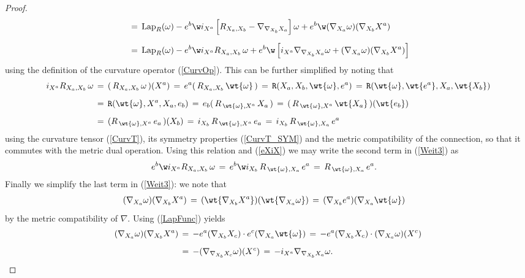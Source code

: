 \documentclass[sections]{tjwNOTES}
\newcommand{\LapR}{\text{Lap}_{R}}
\begin{document}
\begin{proof}
\begin{align}
		\nonumber  &\,=\, \LapR(\omega) - e^{b} \w i_{X^{a}}\left[R_{X_{a},X_{b}} - \nabla_{\nabla_{X_{b}}X_{a}} \right]\omega + e^{b} \w  (\nabla_{X_{a}}\omega)(\nabla_{X_{b}}X^{a}) \\[0.2cm]
		\label{Weit3} &\,=\,  \LapR(\omega) - e^{b} \w i_{X^{a}}R_{X_{a},X_{b}}\,\omega + e^{b} \w \left[i_{X^{a}}\nabla_{\nabla_{X_{b}}X_{a}}\omega + (\nabla_{X_{a}}\omega)(\nabla_{X_{b}}X^{a})\right]
	\end{align}
	using the definition of the curvature operator (\ref{CurvOp}). This can be further simplified by noting that
	\begin{align*}
		i_{X^{a}}R_{X_{a},X_{b}}\,\omega &\,=\, (\,R_{X_{a},X_{b}}\,\omega \,)(X^{a}) \,=\, e^{a}(\,R_{X_{a},X_{b}}\,\wt{\omega} \,) \,=\, \texttt{R}(X_{a},X_{b},\wt{\omega},e^{a}) \,=\, \texttt{R}(\wt{\omega},\wt{e^{a}},X_{a},\wt{X_{b}}) \\[0.2cm]
		&\,=\, \texttt{R}(\wt{\omega},X^{a},X_{a},e_{b}) \,=\, e_{b}( \,R_{\,\wt{\omega},X^{a}}\,X_{a} \,) \,=\, (\, R_{\,\wt{\omega},X^{a}}\,\wt{X_{a}}\, )(\wt{e_{b}}) \\[0.2cm]
		&\,=\, ( R_{\,\wt{\omega},X^{a}}\,e_{a}\, )(X_{b})  \,=\, i_{X_{b}}\,R_{\,\wt{\omega},X^{a}}\,e_{a} \,=\, i_{X_{b}}\,R_{\,\wt{\omega},X_{a}}\,e^{a}
	\end{align*}
	using the curvature tensor (\ref{CurvT}), its symmetry properties (\ref{CurvT_SYM}) and the metric compatibility of the connection, so that it commutes with the metric dual operation. Using this relation and (\ref{eXiX}) we may write the second term in (\ref{Weit3}) as
	\begin{align*}
		e^{b} \w i_{X^{a}}R_{X_{a},X_{b}}\,\omega &\,=\, e^{b} \w i_{X_{b}}\,R_{\,\wt{\omega},X_{a}}\,e^{a} \,=\, R_{\,\wt{\omega},X_{a}}\,e^{a}.
	\end{align*}
	Finally we simplify the last term in (\ref{Weit3}): we note that
	\begin{align*}
		(\nabla_{X_{a}}\omega)(\nabla_{X_{b}}X^{a}) &\,=\, (\wt{\nabla_{X_{b}}X^{a}})(\wt{\nabla_{X_{a}}\omega}) \,=\, (\nabla_{X_{b}}e^{a})(\nabla_{X_{a}}\wt{\omega})
	\end{align*}
	by the metric compatibility of $\nabla$. Using (\ref{LapFunc}) yields
	\begin{align*}
		(\nabla_{X_{a}}\omega)(\nabla_{X_{b}}X^{a}) &\,=\, - e^{a}(\nabla_{X_{b}}X_{c})\cdot e^{c}(\nabla_{X_{a}}\wt{\omega}) \,=\, - e^{a}(\nabla_{X_{b}}X_{c})\cdot (\nabla_{X_{a}}\omega)(X^{c}) \\[0.2cm]
		&\,=\, -(\nabla_{\nabla_{X_{b}}X_{c}}\omega)(X^{c}) \,=\, -i_{X^{a}}\nabla_{\nabla_{X_{b}}X_{a}}\omega.

\end{align*}
\end{proof}
\end{document}
